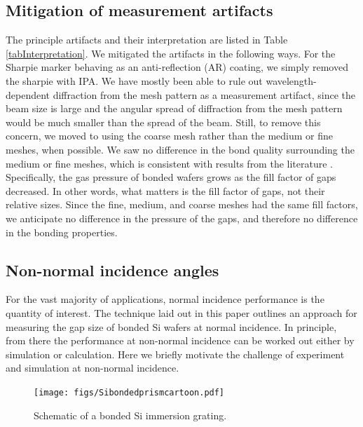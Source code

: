 \documentclass[osajnl,preprint,showpacs,superscriptaddress,12pt]{revtex4-1} %
\begin{document}
\subsection{Mitigation of measurement artifacts}
The principle artifacts and their interpretation are listed in Table \ref{tabInterpretation}.  We mitigated the artifacts in the following ways.  For the Sharpie marker behaving as an anti-reflection (AR) coating, we simply removed the sharpie with IPA.  We have mostly been able to rule out wavelength-dependent diffraction from the mesh pattern as a measurement artifact, since the beam size is large and the angular spread of diffraction from the mesh pattern would be much smaller than the spread of the beam.  Still, to remove this concern, we moved to using the coarse mesh rather than the medium or fine meshes, when possible.  We saw no difference in the bond quality surrounding the medium or fine meshes, which is consistent with results from the literature \cite{1992JEMat..21..669M}.  Specifically, the gas pressure of bonded wafers grows as the fill factor of gaps decreased.  In other words, what matters is the fill factor of gaps, not their relative sizes.  Since the fine, medium, and coarse meshes had the same fill factors, we anticipate no difference in the pressure of the gaps, and therefore no difference in the bonding properties.

\subsection{Non-normal incidence angles}
For the vast majority of applications, normal incidence performance is the quantity of interest.  The technique laid out in this paper outlines an approach for measuring the gap size of bonded Si wafers at normal incidence.  In principle, from there the performance at non-normal incidence can be worked out either by simulation or calculation.  Here we briefly motivate the challenge of experiment and simulation at non-normal incidence.  

\begin{figure}[htbp]
\centerline{\texttt{[image: figs/Sibondedprismcartoon.pdf]}}
\caption{Schematic of a bonded Si immersion grating\label{figSiPrism}.  }
\end{figure}
\end{document}

